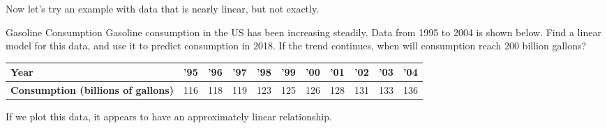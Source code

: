 Now let's try an example with data that is nearly linear, but not exactly.
\begin{example}[https://www.youtube.com/watch?v=QoOdfeLBN0o]{Gasoline Consumption}
Gasoline consumption in the US has been increasing steadily.  Data from 1995 to 2004 is shown below.  Find a linear model for this data, and use it to predict consumption in 2018.  If the trend continues, when will consumption reach 200 billion gallons?\\

\begin{center}
\begin{tabular}{|p{1in} | c | c | c | c | c | c | c | c | c | c|}
\hline
\textbf{Year} & '95 & '96 & '97 & '98 & '99 & '00 & '01 & '02 & '03 & '04\\
\hline
\textbf{Consumption (billions of gallons)} & 116 & 118 & 119 & 123 & 125 & 126 & 128 & 131 & 133 & 136\\
\hline
\end{tabular}
\end{center}

If we plot this data, it appears to have an approximately linear relationship.
\begin{center}
\end{center}


\end{example}
